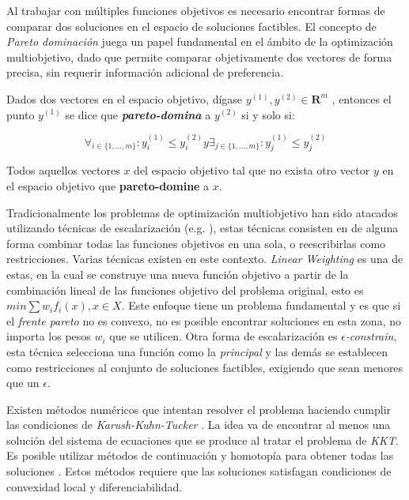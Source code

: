 Al trabajar con múltiples funciones objetivos es necesario encontrar formas de comparar dos soluciones en el espacio de soluciones factibles.
El concepto de \textit{Pareto dominación} juega un papel fundamental en el ámbito de la optimización multiobjetivo, dado que permite comparar objetivamente dos vectores de forma precisa, sin requerir información adicional de preferencia.

\begin{definition}
\label{definition:pareto-dominance}

    Dados dos vectores en el espacio objetivo, dígase $y^{(1)}, y^{(2)} \in \mathbf{R}^m$ , entonces el punto $y^{(1)}$ se dice que \textbf{\textit{pareto-domina}} a $y^{(2)}$ si y solo si:

    \begin{equation}
        \forall_{i\in\{1,\dots,m\}}: y_i^{(1)} \leq y_i^{(2)} y \exists_{j\in\{1,\dots,m\}}: y_j^{(1)} \le y_j^{(2)}
    \end{equation}
\end{definition}

\begin{definition}
\label{definition:pareto-front}
    Todos aquellos vectores $x$ del espacio objetivo tal que no exista otro vector $y$ en el espacio objetivo que \textbf{pareto-domine} a $x$.
\end{definition}

Tradicionalmente los problemas de optimización multiobjetivo han sido atacados utilizando técnicas de escalarización (e.g. \parencite{miettinen2012nonlinear}), estas técnicas consisten en de alguna forma combinar todas las funciones objetivos en una sola, o reescribirlas como restricciones.
Varias técnicas existen en este contexto. \textit{Linear Weighting} es una de estas, en la cual se construye una nueva función objetivo a partir de la combinación lineal de las funciones objetivo del problema original, esto es $min \sum w_i f_i(x), x \in X$.
Este enfoque tiene un problema fundamental y es que si el \emph{frente pareto} no es convexo, no es posible encontrar soluciones en esta zona, no importa los pesos $w_i$ que se utilicen.
Otra forma de escalarización es \textit{$\epsilon$-constrain}, esta técnica selecciona una función como la \textit{principal} y las demás se establecen como restricciones al conjunto de soluciones factibles, exigiendo que sean menores que un $\epsilon$.

Existen métodos numéricos que intentan resolver el problema haciendo cumplir las condiciones de \emph{Karush-Kuhn-Tucker} \parencite{kuhn2014nonlinear}.
La idea va de encontrar al menos una solución del sistema de ecuaciones que se produce al tratar el problema de \textit{KKT}.
Es posible utilizar métodos de continuación y homotopía para obtener todas las soluciones \parencite{hillermeier2001nonlinear, schutze2005continuation}.
Estos métodos requiere que las soluciones satisfagan condiciones de convexidad local y diferenciabilidad.

